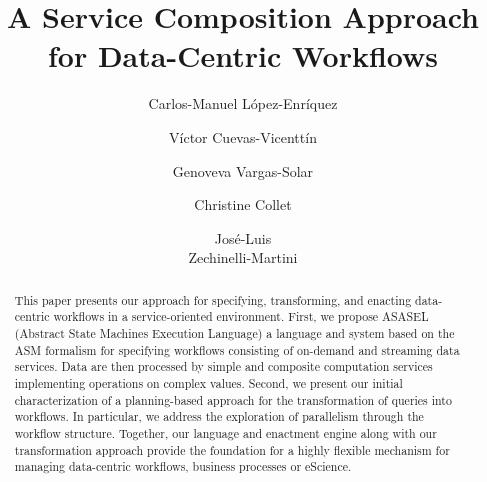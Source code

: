 \documentclass{llncs}
\begin{document}

\title{A Service Composition Approach for Data-Centric Workflows}
%
%
\author{
Carlos-Manuel L\'opez-Enr\'iquez \and V\'ictor Cuevas-Vicentt\'in \and Genoveva Vargas-Solar
\and Christine Collet \and Jos\'e-Luis \\Zechinelli-Martini
}
%
%
%


\maketitle              %

\begin{abstract}

This paper presents our approach for specifying, transforming, and enacting data-centric workflows in a service-oriented environment. First, we propose ASASEL (Abstract State Machines Execution Language) a language and system based on the ASM formalism for specifying workflows consisting of on-demand and streaming data services. Data are then processed by simple and composite computation services implementing operations on complex values. Second, we present our initial characterization of a planning-based approach for the transformation of queries into workflows. In particular, we address the exploration of parallelism through the workflow structure. Together, our language and enactment engine along with our transformation approach provide the foundation for a highly flexible mechanism for managing data-centric workflows,  business processes or eScience.

\end{abstract}
%
\end{document}
